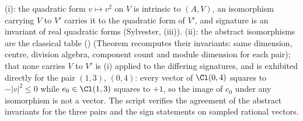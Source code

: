 (i): the quadratic form $v \mapsto v^{2}$ on $V$ is intrinsic to $(A, V)$, an isomorphism carrying $V$ to $V'$ carries it to the quadratic form of $V'$, and signature is an invariant of real quadratic forms (Sylvester, (iii)). (ii): the abstract isomorphisms are the classical table () (Theorem  recomputes their invariants: same dimension, centre, division algebra, component count and module dimension for each pair); that none carries $V$ to $V'$ is (i) applied to the differing signatures, and is exhibited directly for the pair $(1,3)$, $(0,4)$: every vector of $\Cl(0,4)$ squares to $-|v|^{2} \leq 0$ while $e_{0} \in \Cl(1,3)$ squares to $+1$, so the image of $e_{0}$ under any isomorphism is not a vector. The script verifies the agreement of the abstract invariants for the three pairs and the sign statements on sampled rational vectors.
